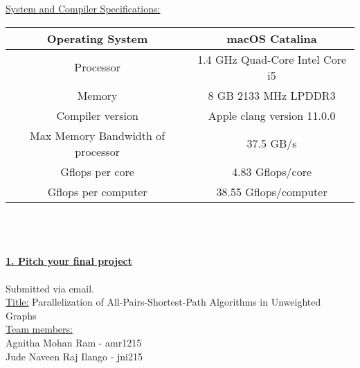 \documentclass[12pt,letterpaper]{article}
\begin{document}
	

{\underline{System and Compiler Specifications:}} \\

\begin{tabular}{ |c|c| } 
 \hline
 Operating System & macOS Catalina  \\
 \hline
 Processor & 1.4 GHz Quad-Core Intel Core i5 \\
 \hline
 Memory & 8 GB 2133 MHz LPDDR3  \\ 
 \hline 
Compiler version & Apple clang version 11.0.0 \\

 \hline
 Max Memory Bandwidth of processor & 37.5 GB/s \\
 \hline
 Gflops per core & 4.83	Gflops/core\\
 \hline
 Gflops per computer & 38.55 Gflops/computer\\
 \hline
\end{tabular}
\\\\\\
\underline{\textbf{1. Pitch your final project}} \\\\
Submitted via email. \\
\underline{Title:} Parallelization of All-Pairs-Shortest-Path Algorithms in Unweighted Graphs \\
\underline{Team members:} \\
Agnitha Mohan Ram - amr1215 \\
Jude Naveen Raj Ilango - jni215\\
\end{document}
